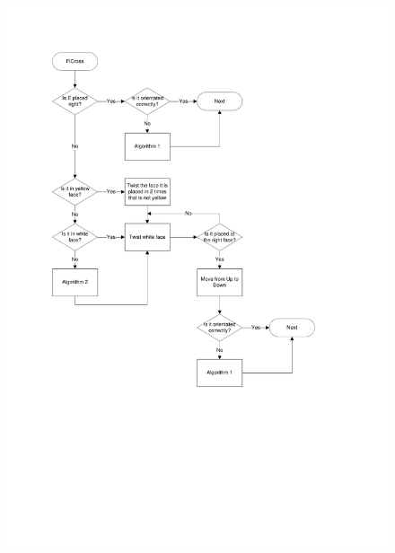 \begin{figure}[htbp]
	\centering
		\includegraphics{input/pics/FlCrossFlow.pdf}
	\label{fig:FlCrossFlow}
\end{figure}


